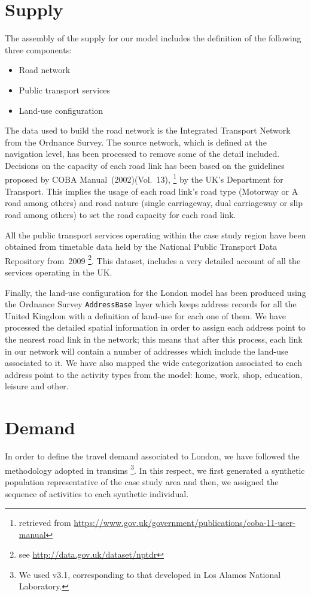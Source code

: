 \section{Supply}
The assembly of the supply for our model includes the definition of the following three components:
%
\begin{itemize}\styleItemize
\item	Road network
\item	Public transport services
\item	Land-use configuration
\end{itemize}
%
The data used to build the road network is the Integrated Transport Network from the Ordnance Survey. The source network, which is defined at the navigation level, has been processed to remove some of the detail included. Decisions on the capacity of each road link has been based on the guidelines proposed by COBA Manual~(2002)(Vol.~13),%
\footnote{retrieved from \url{https://www.gov.uk/government/publications/coba-11-user-manual}} by the UK's Department for Transport. This implies the usage of each road link's road type (Motorway or A road among others) and road nature (single carriageway, dual carriageway or slip road among others) to set the road capacity for each road link.

All the public transport services operating within the case study region have been obtained from timetable data held by the National Public Transport Data Repository from~2009%
\footnote{see \url{http://data.gov.uk/dataset/nptdr}}. This dataset, includes a very detailed account of all the services operating in the UK.

Finally, the land-use configuration for the London model has been produced using the Ordnance Survey \lstinline|AddressBase| layer which keeps address records for all the United Kingdom with a definition of land-use for each one of them. We have processed the detailed spatial information in order to assign each address point to the nearest road link in the network; this means that after this process, each link in our network will contain a number of addresses which include the land-use associated to it. We have also mapped the wide categorization associated to each address point to the activity types from the model: home, work, shop, education, leisure and other.

\section{Demand}
In order to define the travel demand associated to London, we have followed the methodology adopted in \gls{transims}%
\footnote{We used v3.1, corresponding to that developed in Los Alamos National Laboratory.}. 
In this respect, we first generated a synthetic population representative of the case study area and then, we assigned the sequence of activities to each synthetic individual.


